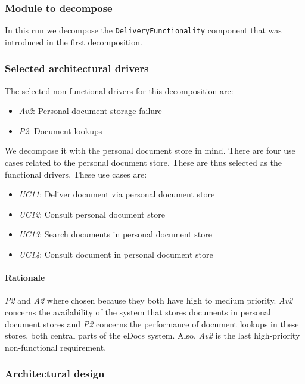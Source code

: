 \documentclass[a4paper,10pt]{article}
\begin{document}
\subsubsection{Module to decompose}
In this run we decompose the \texttt{DeliveryFunctionality} component that was introduced in the first decomposition. 

\subsubsection{Selected architectural drivers}
The selected non-functional drivers for this decomposition are:

\begin{itemize}
	\item \emph{Av2}: Personal document storage failure
	\item \emph{P2}: Document lookups
\end{itemize}

We decompose it with the personal document store in mind. There are four use cases related to the personal document store. These are thus selected as the functional drivers. These use cases are: 

\begin{itemize}
	\item \emph{UC11}: Deliver document via personal document store
	\item \emph{UC12}: Consult personal document store
	\item \emph{UC13}: Search documents in personal document store
	\item \emph{UC14}: Consult document in personal document store
\end{itemize}

\paragraph{Rationale} \emph{P2} and \emph{A2} where chosen because they both have high to medium priority. \emph{Av2} concerns the availability of the system that stores documents in personal document stores and \emph{P2} concerns the performance of document lookups in these stores, both central parts of the eDocs system. Also, \emph{Av2} is the last high-priority non-functional requirement.

\subsubsection{Architectural design}
\end{document}
